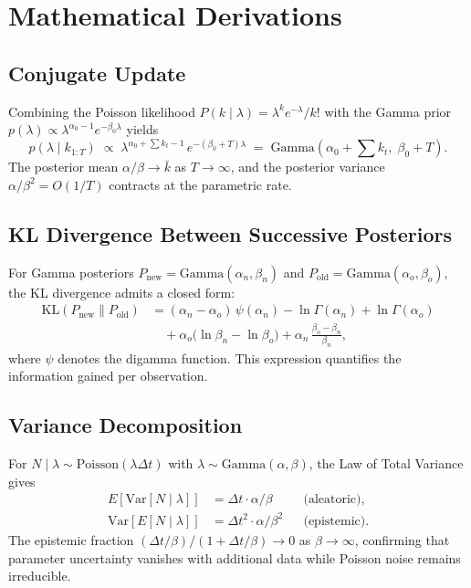 \documentclass[10pt, twocolumn]{article}
\begin{document}
\clearpage
\onecolumn
\appendix
\renewcommand{\thesection}{\Alph{section}}

\section{Mathematical Derivations}\label{app:math}

\subsection{Conjugate Update}

Combining the Poisson likelihood $P(k \mid \lambda) = \lambda^k e^{-\lambda}/k!$ with the Gamma prior $p(\lambda) \propto \lambda^{\alpha_0 - 1} e^{-\beta_0 \lambda}$ yields
\[
    p(\lambda \mid k_{1:T}) \;\propto\;
    \lambda^{\alpha_0 + \sum k_t - 1}\,
    e^{-(\beta_0 + T)\lambda}
    \;=\;
    \mathrm{Gamma}\!\left(\alpha_0 + \textstyle\sum k_t,\; \beta_0 + T\right).
\]
The posterior mean $\alpha/\beta \to \bar{k}$ as $T \to \infty$, and the posterior variance $\alpha/\beta^2 = O(1/T)$ contracts at the parametric rate.

\subsection{KL Divergence Between Successive Posteriors}

For Gamma posteriors $P_{\text{new}} = \mathrm{Gamma}(\alpha_n, \beta_n)$ and $P_{\text{old}} = \mathrm{Gamma}(\alpha_o, \beta_o)$, the KL divergence admits a closed form:
\begin{align}
    \mathrm{KL}(P_\text{new} \| P_\text{old})
    &= (\alpha_n - \alpha_o)\,\psi(\alpha_n)
    - \ln\Gamma(\alpha_n) + \ln\Gamma(\alpha_o) \nonumber\\
    &\quad + \alpha_o\bigl(\ln\beta_n - \ln\beta_o\bigr)
    + \alpha_n\,\frac{\beta_o - \beta_n}{\beta_n},
\end{align}
where $\psi$ denotes the digamma function. This expression quantifies the information gained per observation.

\subsection{Variance Decomposition}

For $N \mid \lambda \sim \mathrm{Poisson}(\lambda \Delta t)$ with $\lambda \sim \mathrm{Gamma}(\alpha, \beta)$, the Law of Total Variance gives
\begin{align}
    E[\mathrm{Var}[N \mid \lambda]]
    &= \Delta t \cdot \alpha / \beta
    &&\text{(aleatoric),} \\
    \mathrm{Var}[E[N \mid \lambda]]
    &= \Delta t^2 \cdot \alpha / \beta^2
    &&\text{(epistemic).}
\end{align}
The epistemic fraction $(\Delta t / \beta)\big/(1 + \Delta t / \beta) \to 0$ as $\beta \to \infty$, confirming that parameter uncertainty vanishes with additional data while Poisson noise remains irreducible.
\end{document}
